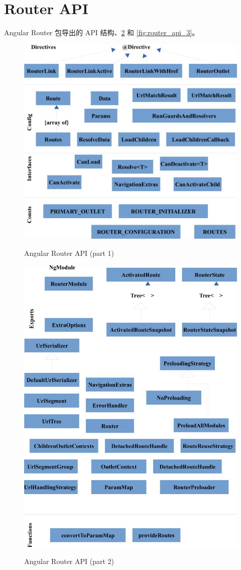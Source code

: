 \section{Router API}


Angular Router 包导出的 API 结构、\ref{fig:router_api_2} 和 \ref{fig:router_api_3}。

\begin{figure}[!hbt]
  \centering
  \caption{Angular Router API (part 1)}
  \includegraphics[width=0.55\linewidth]{13_the_router_package/router_api_1}
  \label{fig:router_api_1}
\end{figure}

\begin{figure}[!hbt]
  \centering
  \caption{Angular Router API (part 2)}
  \includegraphics[width=0.75\linewidth]{13_the_router_package/router_api_2}
  \label{fig:router_api_2}
\end{figure}

